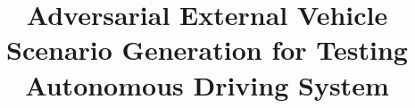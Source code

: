 \documentclass[sigconf,review,anonymous]{acmart}
\begin{document}
\title{Adversarial External Vehicle Scenario Generation for Testing Autonomous Driving System}

\end{document}
